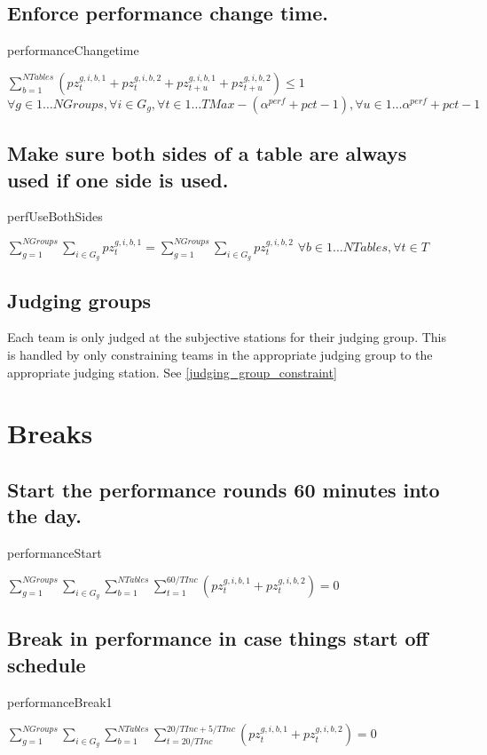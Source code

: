\documentclass[letterpaper,11pt]{report}
\begin{document}
\FloatBarrier
\subsection{Enforce performance change time.}
\begin{algorithm}
\caption{performanceChangetime}
$
\sum\limits_{b=1}^{NTables} (
pz_{t}^{g,i,b,1} + pz_{t}^{g,i,b,2}
+
pz_{t+u}^{g,i,b,1} + pz_{t+u}^{g,i,b,2})
\le 1$
\hfill $
\forall g \in 1 \dots NGroups,
\forall i \in G_{g}, 
\forall t \in 1 \dots TMax - (\alpha^{perf} + pct - 1),
\forall u \in 1 \dots \alpha^{perf} + pct - 1$
\end{algorithm}

\FloatBarrier
\subsection{Make sure both sides of a table are always used if one side is
  used.}
\begin{algorithm}
\caption{perfUseBothSides}
$\sum\limits_{g=1}^{NGroups}\sum\limits_{i \in G_{g}} pz_{t}^{g,i,b,1} 
= 
\sum\limits_{g=1}^{NGroups}\sum\limits_{i \in G_{g}}pz_{t}^{g,i,b,2}$
\hfill $
\forall b \in 1 \dots NTables,
\forall t \in T$
\end{algorithm}


\FloatBarrier
\subsection{Judging groups}
Each team is only judged at the subjective stations for their judging
group. This is handled by only constraining teams in the appropriate
judging group to the appropriate judging station. See \autoref{judging_group_constraint}


\FloatBarrier
\section{Breaks}
\subsection{Start the performance rounds 60 minutes into the day.}
\begin{algorithm}
\caption{performanceStart}
$
\sum\limits_{g=1}^{NGroups}
\sum\limits_{i \in G_{g}} 
  \sum\limits_{b=1}^{NTables} 
    \sum\limits_{t = 1}^{60/TInc} 
      ( pz_{t}^{g,i,b,1} + pz_{t}^{g,i,b,2} ) = 0$
\end{algorithm}

\FloatBarrier
\subsection{Break in performance in case things start off schedule}
\begin{algorithm}
\caption{performanceBreak1}
$
\sum\limits_{g=1}^{NGroups}
\sum\limits_{i \in G_{g}} 
  \sum\limits_{b=1}^{NTables} 
    \sum\limits_{t = 20/TInc}^{20/TInc + 5/TInc} 
      ( pz_{t}^{g,i,b,1} + pz_{t}^{g,i,b,2} ) = 0$
\end{algorithm}
\end{document}
